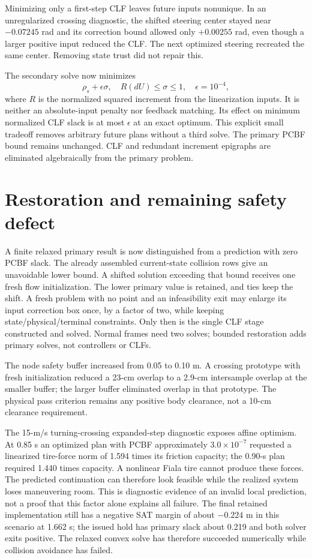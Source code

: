 \documentclass[11pt]{article}
\begin{document}
Minimizing only a first-step CLF leaves future inputs nonunique. In an
unregularized crossing diagnostic, the shifted steering center stayed near
$-0.07245$ rad and its correction bound allowed only $+0.00255$ rad, even
though a larger positive input reduced the CLF. The next optimized steering
recreated the same center. Removing state trust did not repair this.

The secondary solve now minimizes
\[
 \rho_s+\epsilon\sigma,\quad R(dU)\le\sigma\le1,
 \quad \epsilon=10^{-4},
\]
where $R$ is the normalized squared increment from the linearization inputs.
It is neither an absolute-input penalty nor feedback matching. Its effect
on minimum normalized CLF slack is at most $\epsilon$ at an exact optimum.
This explicit small tradeoff removes arbitrary future plans without a third
solve. The primary PCBF bound remains unchanged. CLF and redundant increment
epigraphs are eliminated algebraically from the primary problem.

\section{Restoration and remaining safety defect}
A finite relaxed primary result is now distinguished from a prediction with
zero PCBF slack. The already assembled current-state collision rows give an
unavoidable lower bound. A shifted solution exceeding that bound receives
one fresh flow initialization. The lower primary value is retained, and ties
keep the shift. A fresh problem with no point and an infeasibility exit may enlarge its input correction box once,
by a factor of two, while keeping state/physical/terminal constraints. Only
then is the single CLF stage constructed and solved. Normal frames need two
solves; bounded restoration adds primary solves, not controllers or CLFs.

The node safety buffer increased from 0.05 to 0.10 m. A crossing prototype
with fresh initialization reduced a 23-cm overlap to a 2.9-cm intersample
overlap at the smaller buffer; the larger buffer eliminated overlap in that
prototype. The physical pass criterion remains any positive body clearance,
not a 10-cm clearance requirement.

The 15-m/s turning-crossing expanded-step diagnostic exposes affine optimism.
At 0.85 s an optimized plan with PCBF approximately $3.0\times10^{-7}$
requested a linearized tire-force norm of 1.594 times its friction capacity;
the 0.90-s plan required 1.440 times capacity. A nonlinear Fiala tire cannot
produce these forces. The predicted continuation can therefore look feasible
while the realized system loses maneuvering room. This is diagnostic evidence
of an invalid local prediction, not a proof that this factor alone explains
all failure. The final retained implementation still has a negative SAT
margin of about $-0.224$ m in this scenario at 1.662 s; the issued hold
has primary slack about 0.219 and both solver exits positive. The relaxed
convex solve has therefore succeeded numerically while collision avoidance
has failed.
\end{document}
